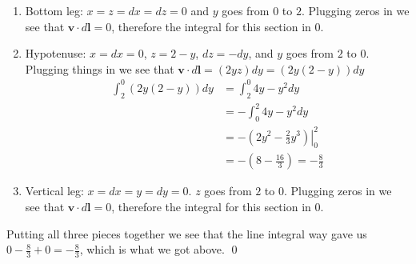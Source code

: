 \documentclass{homework}
\newcommand{\bs}[1]{\ensuremath{\boldsymbol{#1}}}
\begin{document}
\begin{homeworkProblem}[Problem 1.34]
{  \begin{enumerate}
    \item Bottom leg: $x=z=dx=dz=0$ and $y$ goes from $0$ to $2$. Plugging zeros in we see that $\bs{v} \cdot d \bs{l} = 0$, therefore the integral for this section in $0$.
    \item Hypotenuse: $x=dx=0$, $z = 2-y$, $dz = -dy$, and $y$ goes from $2$ to $0$. Plugging things in we see that $\bs{v} \cdot d \bs{l} = (2yz)dy = (2y(2-y))dy$
    \begin{align*}
      \int_2^0 (2y(2-y))dy &= \int_2^0 4y - y^2 dy \\
        &=  - \int_0^2 4y - y^2 dy \\
        &= - \left. \left(2y^2 - \frac{2}{3} y^3 \right) \right|_0^2 \\
        &= -(8 - \frac{16}{3}) = -\frac{8}{3}
    \end{align*}
    \item Vertical leg: $x=dx=y=dy=0$.  $z$ goes from $2$ to $0$. Plugging zeros in we see that $\bs{v} \cdot d \bs{l} = 0$, therefore the integral for this section in $0$.
  \end{enumerate}

  Putting all three pieces together we see that the line integral way gave us $0 -\frac{8}{3} + 0 = -\frac{8}{3}$, which is what we got above. \qed
  }
\end{homeworkProblem}
\end{document}
